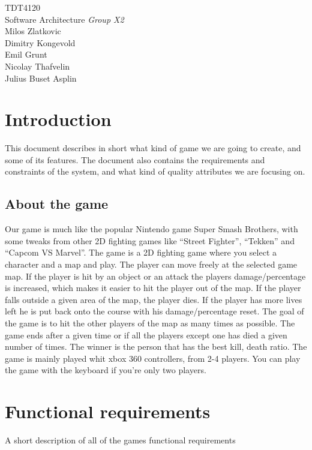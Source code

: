 



{\LARGE TDT4120 \\ \large Software Architecture}
{{\large\emph{Group X2}}\\[0.2cm]
	Milos Zlatkovic \\
	Dimitry Kongevold \\
	Emil Grunt\\
	Nicolay Thafvelin\\
	Julius Buset Asplin\\
}

\tableofcontents

\chapter{Introduction}
	This document describes in short what kind of game we are going to create, and some of its features. The document also contains the requirements and constraints of the system, and what kind of quality attributes we are focusing on.

\section{About the game}
	Our game is much like the popular Nintendo game Super Smash Brothers, with some tweaks from other 2D fighting games like ``Street Fighter'', ``Tekken'' and ``Capcom VS Marvel''. The game is a 2D fighting game where  you select a character and a map and play. The player can move freely at the selected game map. If the player is hit by an object or an attack the players damage/percentage is increased, which makes it easier to hit the player out of the map. If the player falls outside a given area of the map, the player dies. If the player has more lives left he is put back onto the course with his damage/percentage reset. The goal of the game is to hit the other players of the map as many times as possible. The game ends after a given time or if all the players except one has died a given number of times. The winner is the person that has the best kill, death ratio. The game is mainly played whit xbox 360 controllers, from 2-4 players. You can play the game with the keyboard if you're only two players.

\chapter{Functional requirements}
A short description of all of the games functional requirements
